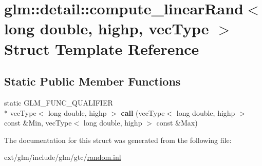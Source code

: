 \hypertarget{structglm_1_1detail_1_1compute__linear_rand_3_01long_01double_00_01highp_00_01vec_type_01_4}{\section{glm\-:\-:detail\-:\-:compute\-\_\-linear\-Rand$<$ long double, highp, vec\-Type $>$ Struct Template Reference}
\label{structglm_1_1detail_1_1compute__linear_rand_3_01long_01double_00_01highp_00_01vec_type_01_4}
}
\subsection*{Static Public Member Functions}
\begin{DoxyCompactItemize}
\item 
\hypertarget{structglm_1_1detail_1_1compute__linear_rand_3_01long_01double_00_01highp_00_01vec_type_01_4_ace5ddc612cfa5043fad6b875fdb86553}{static G\-L\-M\-\_\-\-F\-U\-N\-C\-\_\-\-Q\-U\-A\-L\-I\-F\-I\-E\-R \\*
vec\-Type$<$ long double, highp $>$ {\bfseries call} (vec\-Type$<$ long double, highp $>$ const \&Min, vec\-Type$<$ long double, highp $>$ const \&Max)}\label{structglm_1_1detail_1_1compute__linear_rand_3_01long_01double_00_01highp_00_01vec_type_01_4_ace5ddc612cfa5043fad6b875fdb86553}

\end{DoxyCompactItemize}


The documentation for this struct was generated from the following file\-:\begin{DoxyCompactItemize}
\item 
ext/glm/include/glm/gtc/\hyperlink{random_8inl}{random.\-inl}\end{DoxyCompactItemize}
